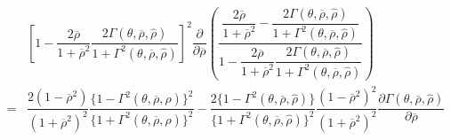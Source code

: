 \documentclass[10.0pt]{article}
\begin{document}
{\footnotesize \begin{eqnarray*}
& & \left[ 1 - \dfrac{2 \overline{\rho}}{1 + \overline{\rho}^2} \dfrac{2 \Gamma (\theta, \overline{\rho}, {\hat \rho})}{1 + \Gamma^2 (\theta, \overline{\rho}, {\hat \rho})} \right]^2 \dfrac{\partial}{\partial \overline{\rho}} \left( \dfrac{\dfrac{2 \overline{\rho}}{1 + \overline{\rho}^2} - \dfrac{2 \Gamma (\theta, \overline{\rho}, {\hat \rho})}{1 + \Gamma^2 (\theta, \overline{\rho}, {\hat \rho})}}{1 - \dfrac{2 \overline{\rho}}{1 + \overline{\rho}^2} \dfrac{2 \Gamma (\theta, \overline{\rho}, {\hat \rho})}{1 + \Gamma^2 (\theta, \overline{\rho}, {\hat \rho})}} \right) \\
& = & \dfrac{2 (1 - \overline{\rho}^2)}{(1 + \overline{\rho}^2)^2} \dfrac{\{ 1 - \Gamma^2 (\theta, \overline{\rho}, {\hat \rho}) \}^2}{\{ 1 + \Gamma^2 (\theta, \overline{\rho}, {\hat \rho}) \}^2} - \dfrac{2 \{ 1 - \Gamma^2 (\theta, \overline{\rho}, {\hat \rho}) \}}{\{ 1 + \Gamma^2 (\theta, \overline{\rho}, {\hat \rho}) \}^2} \dfrac{(1 - \overline{\rho}^2)^2}{(1 + \overline{\rho}^2)^2} \dfrac{\partial \Gamma (\theta, \overline{\rho}, {\hat \rho})}{\partial \overline{\rho}} \\

\end{eqnarray*}}
\end{document}
